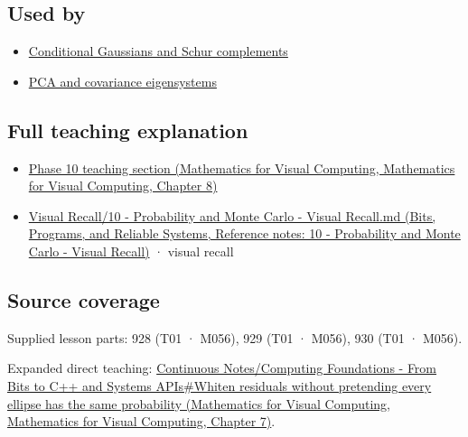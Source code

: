 \subsection{Used by}\label{appendix-12bbe185dbe5-used-by}

\begin{itemize}
\tightlist
\item
  \hyperref[appendix-f0437ea55a47]{Conditional Gaussians and Schur complements}
\item
  \hyperref[appendix-ad175ef3c5bf]{PCA and covariance eigensystems}
\end{itemize}

\subsection{Full teaching explanation}\label{appendix-12bbe185dbe5-full-teaching-explanation}

\begin{itemize}
\tightlist
\item
  \href{../02-Mathematics-for-Visual-Computing/main.pdf\#nameddest=02-foundations-ii-ch024-waiting-times-event-counts-and-covariance-geometry}{Phase 10 teaching section (Mathematics for Visual Computing, Mathematics for Visual Computing, Chapter 8)}
\item
  \href{../01-Bits-Programs-and-Reliable-Systems/main.pdf\#nameddest=appendix-cb5af353ef77}{Visual Recall/10 - Probability and Monte Carlo - Visual Recall.md (Bits, Programs, and Reliable Systems, Reference notes: 10 - Probability and Monte Carlo - Visual Recall)} · visual recall
\end{itemize}

\subsection{Source coverage}\label{appendix-12bbe185dbe5-source-coverage}

Supplied lesson parts: 928 (T01 · M056), 929 (T01 · M056), 930 (T01 · M056).

Expanded direct teaching: \href{../02-Mathematics-for-Visual-Computing/main.pdf\#nameddest=02-foundations-ii-ch023-whiten-residuals-without-pretending-every-ellipse-has-the-same-probability}{Continuous Notes/Computing Foundations - From Bits to C++ and Systems APIs\#Whiten residuals without pretending every ellipse has the same probability (Mathematics for Visual Computing, Mathematics for Visual Computing, Chapter 7)}.

